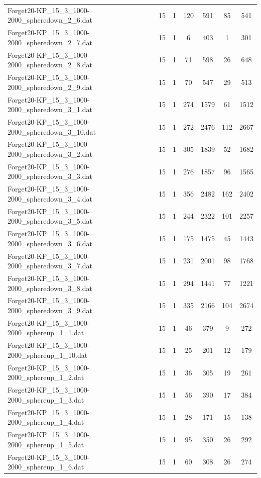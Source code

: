 \begin{table}[!ht]
\begin{tabular}{lcccccc}
Forget20-KP\_15\_3\_1000-2000\_spheredown\_2\_6.dat & 15 & 1 & 120 & 591 & 85 & 541 \\
Forget20-KP\_15\_3\_1000-2000\_spheredown\_2\_7.dat & 15 & 1 & 6 & 403 & 1 & 301 \\
Forget20-KP\_15\_3\_1000-2000\_spheredown\_2\_8.dat & 15 & 1 & 71 & 598 & 26 & 648 \\
Forget20-KP\_15\_3\_1000-2000\_spheredown\_2\_9.dat & 15 & 1 & 70 & 547 & 29 & 513 \\
Forget20-KP\_15\_3\_1000-2000\_spheredown\_3\_1.dat & 15 & 1 & 274 & 1579 & 61 & 1512 \\
Forget20-KP\_15\_3\_1000-2000\_spheredown\_3\_10.dat & 15 & 1 & 272 & 2476 & 112 & 2667 \\
Forget20-KP\_15\_3\_1000-2000\_spheredown\_3\_2.dat & 15 & 1 & 305 & 1839 & 52 & 1682 \\
Forget20-KP\_15\_3\_1000-2000\_spheredown\_3\_3.dat & 15 & 1 & 276 & 1857 & 96 & 1565 \\
Forget20-KP\_15\_3\_1000-2000\_spheredown\_3\_4.dat & 15 & 1 & 356 & 2482 & 162 & 2402 \\
Forget20-KP\_15\_3\_1000-2000\_spheredown\_3\_5.dat & 15 & 1 & 244 & 2322 & 101 & 2257 \\
Forget20-KP\_15\_3\_1000-2000\_spheredown\_3\_6.dat & 15 & 1 & 175 & 1475 & 45 & 1443 \\
Forget20-KP\_15\_3\_1000-2000\_spheredown\_3\_7.dat & 15 & 1 & 231 & 2001 & 98 & 1768 \\
Forget20-KP\_15\_3\_1000-2000\_spheredown\_3\_8.dat & 15 & 1 & 294 & 1441 & 77 & 1221 \\
Forget20-KP\_15\_3\_1000-2000\_spheredown\_3\_9.dat & 15 & 1 & 335 & 2166 & 104 & 2674 \\
Forget20-KP\_15\_3\_1000-2000\_sphereup\_1\_1.dat & 15 & 1 & 46 & 379 & 9 & 272 \\
Forget20-KP\_15\_3\_1000-2000\_sphereup\_1\_10.dat & 15 & 1 & 25 & 201 & 12 & 179 \\
Forget20-KP\_15\_3\_1000-2000\_sphereup\_1\_2.dat & 15 & 1 & 36 & 305 & 19 & 261 \\
Forget20-KP\_15\_3\_1000-2000\_sphereup\_1\_3.dat & 15 & 1 & 56 & 390 & 17 & 384 \\
Forget20-KP\_15\_3\_1000-2000\_sphereup\_1\_4.dat & 15 & 1 & 28 & 171 & 15 & 138 \\
Forget20-KP\_15\_3\_1000-2000\_sphereup\_1\_5.dat & 15 & 1 & 95 & 350 & 26 & 292 \\
Forget20-KP\_15\_3\_1000-2000\_sphereup\_1\_6.dat & 15 & 1 & 60 & 308 & 26 & 274 \\

\end{tabular}
\end{table}
